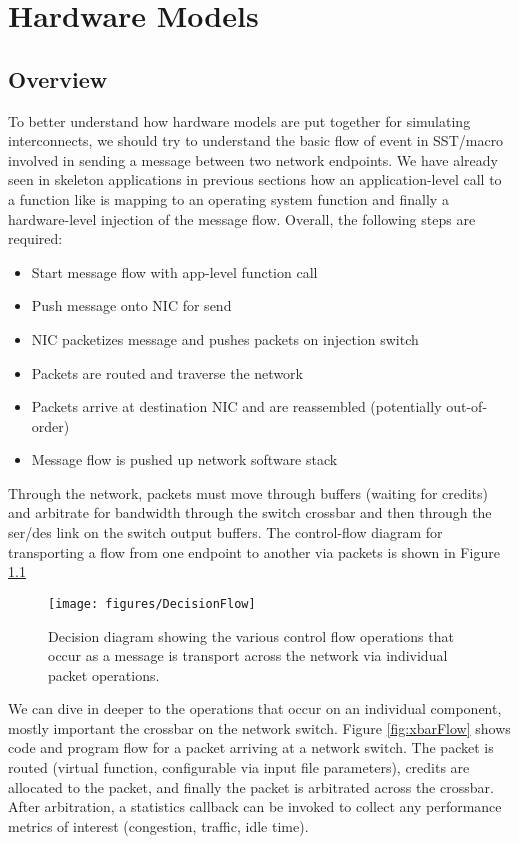 

\chapter{Hardware Models}
\label{chapter:hardware}

\section{Overview}
\label{sec:topOverview}
To better understand how hardware models are put together for simulating interconnects, we should try to understand the basic flow of event in SST/macro involved in sending a message between two network endpoints.  We have already seen in skeleton applications in previous sections how an application-level call to a function like  is mapping to an operating system function and finally a hardware-level injection of the message flow.  Overall, the following steps are required:

\begin{itemize}
\item Start message flow with app-level function call
\item Push message onto NIC for send
\item NIC packetizes message and pushes packets on injection switch
\item Packets are routed and traverse the network
\item Packets arrive at destination NIC and are reassembled (potentially out-of-order)
\item Message flow is pushed up network software stack
\end{itemize}

Through the network, packets must move through buffers (waiting for credits) and arbitrate for bandwidth through the switch crossbar and then through the ser/des link on the switch output buffers.  The control-flow diagram for transporting a flow from one endpoint to another via packets is shown in Figure \ref{fig:controlFlow}

\begin{figure}
\texttt{[image: figures/DecisionFlow]}
\caption{Decision diagram showing the various control flow operations that occur as a message is transport across the network via individual packet operations.}
\label{fig:controlFlow}
\end{figure}

We can dive in deeper to the operations that occur on an individual component, mostly important the crossbar on the network switch. Figure \ref{fig:xbarFlow} shows code and program flow for a packet arriving at a network switch.  The packet is routed (virtual function, configurable via input file parameters), credits are allocated to the packet, and finally the packet is arbitrated across the crossbar. After arbitration, a statistics callback can be invoked to collect any performance metrics of interest (congestion, traffic, idle time).

